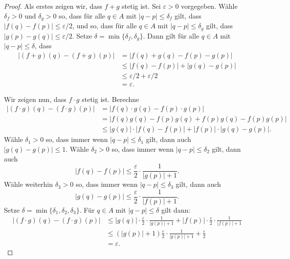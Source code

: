 \documentclass[../main.tex]{subfiles}
\begin{document}
\begin{proof}
  Als erstes zeigen wir,
  dass $f  + g$ stetig ist.
  Sei $\varepsilon > 0$ vorgegeben.
  Wähle $\delta_f > 0$ und  $\delta_g > 0$ 
  so, dass für alle $q \in A$ mit
  $|q - p| \leq \delta_f$ gilt, dass
  $|f(q) - f(p)| \leq \varepsilon/2$,
  und so, dass für alle
  $q \in A$ mit $|q - p| \leq \delta_g$ 
  gilt, dass
  $|g(p) - g(q)| \leq \varepsilon/2$.
  Setze $\delta = \min \{\delta_f, \delta_g\}$.
  Dann gilt für alle $q \in A$ mit
  $|q - p| \leq \delta$, dass
  \begin{align*}
  |(f + g)(q) - (f + g)(p)| &     = |f(q) + g(q) - f(p) - g(p)|\\
                            & \leq |f(q) - f(p)| + |g(q) - g(p)|\\
                            & \leq \varepsilon/2 + \varepsilon/2\\
                            &= \varepsilon.
  \end{align*}

  Wir zeigen nun, dass $f \cdot g$ stetig ist.
  Berechne
  \begin{align*}
     |(f\cdot g)(q) - (f \cdot g)(p)|
     & = |f(q) \cdot g(q) - f(p) \cdot g(p)| \\
     & = |f(q)g(q) - f(p)g(q) + f(p)g(q) - f(p) g(p)| \\
     & \leq |g(q)| \cdot |f(q) - f(p)| + 
     |f(p)| \cdot |g(q) - g(p)|.
  \end{align*}
  Wähle $\delta_1 > 0$ so, dass immer wenn
  $|q - p| \leq \delta_1$ gilt, dann auch
  $|g(q) - g(p)| \leq 1$. Wähle
  $\delta_2 > 0$ so, dass immer
  wenn $|q - p| \leq \delta_2$ gilt, dann auch
  \[
    |f(q) - f(p)| \leq \frac{\varepsilon}{2} \cdot
    \frac{1}{|g(p)| + 1}.
  \]
  Wähle weiterhin $\delta_3 > 0$ so, dass immer wenn
  $|q - p| \leq \delta_3$ gilt, dann auch
  \[
    |g(q) - g(p)| \leq \frac{\varepsilon}{2} \cdot
    \frac{1}{|f(p)| + 1}.
  \]
  Setze $\delta = \min \{\delta_1, \delta_2, \delta_3 \}$.
  Für $q \in A$ mit $|q - p| \leq \delta$ gilt dann:
  \begin{align*}
    |(f \cdot g)(q) - (f \cdot g)(p)|
    &\leq |g(q)| \cdot \frac{\varepsilon}{2} \cdot  
    \frac{1}{|g(p)| + 1}
    + |f(p)| \cdot \frac{\varepsilon}{2}
    \cdot \frac{1}{|f(p)| + 1}\\
    & \leq (|g(p)| + 1) \frac{\varepsilon}{2}
    \cdot \frac{1}{|g(p)| + 1} + \frac{\varepsilon}{2}  \\
    &= \varepsilon.
  \end{align*}
  

\end{proof}
\end{document}

